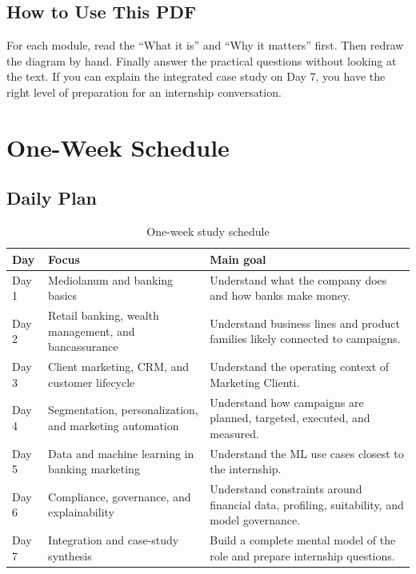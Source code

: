 \documentclass[
	11pt,
	fleqn,
	a4paper,
	oneside,
]{LegrandOrangeBook}
\begin{document}
\section{How to Use This PDF}

For each module, read the ``What it is'' and ``Why it matters'' first. Then redraw the diagram by hand. Finally answer the practical questions without looking at the text. If you can explain the integrated case study on Day 7, you have the right level of preparation for an internship conversation.

\chapter{One-Week Schedule}

\section{Daily Plan}

\begin{table}[H]
	\centering
	\begin{tabularx}{\textwidth}{L{0.12\textwidth} L{0.36\textwidth} Y}
		\toprule
		\textbf{Day} & \textbf{Focus} & \textbf{Main goal}\\
		\midrule
		Day 1 & Mediolanum and banking basics & Understand what the company does and how banks make money.\\
		Day 2 & Retail banking, wealth management, and bancassurance & Understand business lines and product families likely connected to campaigns.\\
		Day 3 & Client marketing, CRM, and customer lifecycle & Understand the operating context of Marketing Clienti.\\
		Day 4 & Segmentation, personalization, and marketing automation & Understand how campaigns are planned, targeted, executed, and measured.\\
		Day 5 & Data and machine learning in banking marketing & Understand the ML use cases closest to the internship.\\
		Day 6 & Compliance, governance, and explainability & Understand constraints around financial data, profiling, suitability, and model governance.\\
		Day 7 & Integration and case-study synthesis & Build a complete mental model of the role and prepare internship questions.\\
		\bottomrule
	\end{tabularx}
	\caption{One-week study schedule}
\end{table}
\end{document}
